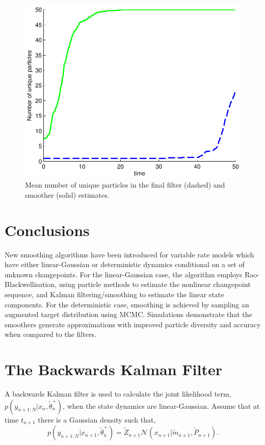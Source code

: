 \documentclass[peerreview,11pt,draftcls,onecolumn]{IEEEtran}
\begin{document}
\begin{figure}[!t]
\centering
\includegraphics[width=0.45\columnwidth]{tracking_unique_particles.pdf}
\caption{Mean number of unique particles in the final filter (dashed) and smoother (solid) estimates.}
\label{fig:tracking_unique_particles}
\end{figure}



\section{Conclusions}

New smoothing algorithms have been introduced for variable rate models which have either linear-Gaussian or deterministic dynamics conditional on a set of unknown changepoints. For the linear-Gaussian case, the algorithm employs Rao-Blackwellisation, using particle methods to estimate the nonlinear changepoint sequence, and Kalman filtering/smoothing to estimate the linear state components. For the deterministic case, smoothing is achieved by sampling an augmented target distribution using MCMC. Simulations demonstrate that the smoothers generate approximations with improved particle diversity and accuracy when compared to the filters.



\appendices
\section{The Backwards Kalman Filter} \label{app:backwards_KF}

A backwards Kalman filter \cite{Fraser1969,Kitagawa1994} is used to calculate the joint likelihood term, $p(y_{n+1:N}|x_n, \tilde{\theta}_{n}^+)$, when the state dynamics are linear-Gaussian. Assume that at time $t_{n+1}$ there is a Gaussian density such that,
%
\begin{equation}
 p(y_{n+1:N}|x_{n+1}, \tilde{\theta}_{n}^+) = \tilde{Z}_{n+1} \mathcal{N}(x_{n+1}|\tilde{m}_{n+1}, \tilde{P}_{n+1}) \nonumber    .
\end{equation}
\end{document}
